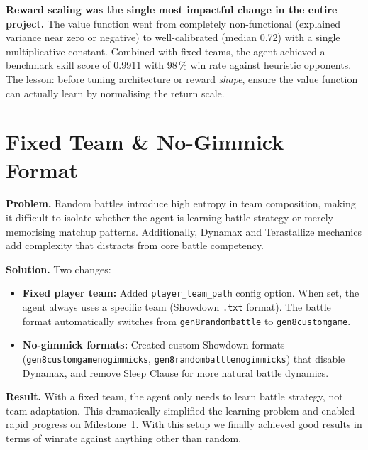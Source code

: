 \begin{keyinsight}
\textbf{Reward scaling was the single most impactful change in the entire
project.}  The value function went from completely non-functional (explained
variance near zero or negative) to well-calibrated (median 0.72) with a single
multiplicative constant.  Combined with fixed teams, the agent achieved a
benchmark skill score of 0.9911 with 98\,\% win rate against heuristic
opponents.  The lesson: before tuning architecture or reward \emph{shape},
ensure the value function can actually learn by normalising the return scale.
\end{keyinsight}


\section{ Fixed Team \& No-Gimmick Format}

\textbf{Problem.} Random battles introduce high entropy in team composition,
making it difficult to isolate whether the agent is learning battle strategy
or merely memorising matchup patterns.  Additionally, Dynamax and Terastallize
mechanics add complexity that distracts from core battle competency.

\textbf{Solution.} Two changes:
\begin{itemize}
  \item \textbf{Fixed player team:} Added \texttt{player\_team\_path} config
        option.  When set, the agent always uses a specific team (Showdown
        \texttt{.txt} format).  The battle format automatically switches from
        \texttt{gen8randombattle} to \texttt{gen8customgame}.
  \item \textbf{No-gimmick formats:} Created custom Showdown formats
        (\texttt{gen8customgamenogimmicks},
        \texttt{gen8randombattlenogimmicks}) that disable Dynamax, and remove
        Sleep Clause for more natural battle dynamics.
\end{itemize}

\textbf{Result.} With a fixed team, the agent only needs to learn battle
strategy, not team adaptation.  This dramatically simplified the learning
problem and enabled rapid progress on Milestone~1.
With this setup we finally achieved good results in terms of winrate against anything other than random.

